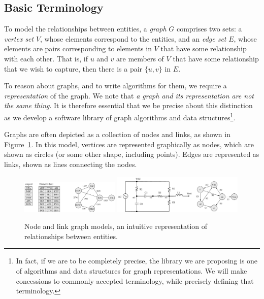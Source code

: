\subsection{Basic Terminology}

To model the relationships between entities, a \emph{graph} $G$ comprises two sets:
a \emph{vertex set} $V$, whose elements correspond to the entities, and an \emph{edge set} $E$, whose
elements are pairs corresponding to elements in $V$ that have some relationship with each other.  That is,
if $u$ and $v$ are members of $V$ that have some relationship that we wish to capture, then there is
a pair $\{u, v\}$ in $E$.

To reason about graphs, and to write algorithms for them, we require a \emph{representation} of the graph.
We note that \emph{a graph and its representation are not the same thing}.  It is therefore essential
that we be precise about this distinction as we develop a software library of graph
algorithms and data structures\footnote{In fact, if we are to be completely precise, the library we are
proposing is one of algorithms and data structures for graph representations.  We will make concessions
to commonly accepted terminology, while precisely defining that terminology.}.

Graphs are often depicted as a collection of nodes and links, as shown in
Figure~\ref{fig:node_link_graphs}. In this model, vertices are
represented graphically as nodes, which are
shown as circles (or some other shape, including points). Edges are represented as links,
shown as lines connecting the nodes.


\begin{figure}[ht]
  \begin{center}
    {\includegraphics[width=0.42\textwidth]{figs/airport.pdf}}
    {\includegraphics[width=0.56\textwidth]{figs/circuit.pdf}}
    \caption{Node and link graph models, an intuitive representation of relationships between entities.\label{fig:node_link_graphs}}
  \end{center}
\end{figure}


